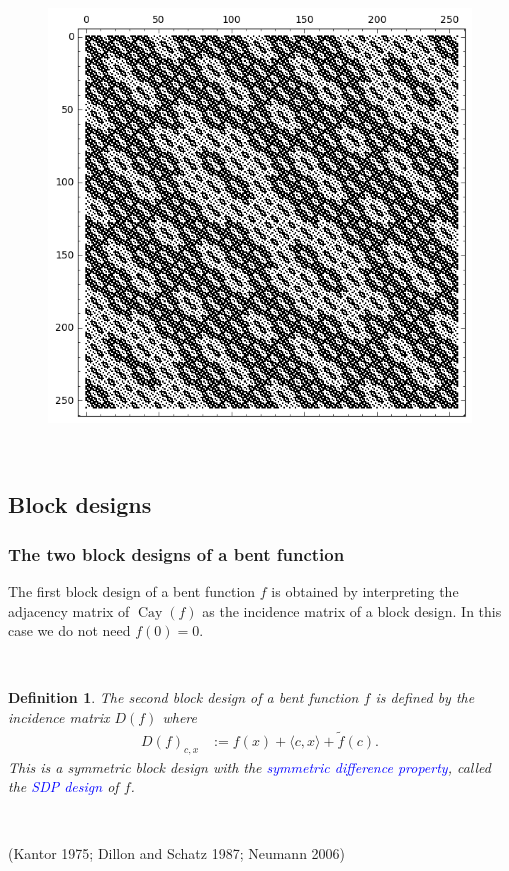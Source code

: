 \documentclass[pdf,sprung,slideColor,nocolorBG]{beamer}
\newenvironment{colortheme}[1]{
\def\ProvidesPackageRCS $##1${\relax}
\renewcommand{\ProcessOptions}{\relax}
\makeatletter

\makeatother
}{}
\newcommand{\slidecite}[1]{\tiny{(#1)}\normalsize{}}
\newcommand{\Emph}[1]{\emph{\textcolor{blue}{#1}}}
\newcommand{\Cay}[1]{\operatorname{Cay}\left(#1\right)}
\newcommand{\dual}[1]{\widetilde{#1}}
\newtheorem{Def}{Definition}
\begin{document}
\begin{colortheme}{jubata}
\begin{frame}
\begin{figure}
\begin{minipage}{.48\textwidth}
  \includegraphics[width=.9\linewidth]{../matrix_plot/c8_1_bent_cayley_graph_index_matrix.png}
  \label{fig:q8_1_bent_cayley_graph_index_matrix}
\end{minipage}
\end{figure}
~
\end{frame}

\end{colortheme}

\subsection{Block designs}

\begin{colortheme}{seagull}

\begin{frame}
\frametitle{The two block designs of a bent function}

The first block design of a bent function $f$ is obtained by interpreting
the adjacency matrix of $\Cay{f}$ as the incidence matrix of a block design.
In this case we do not need $f(0)=0$.

~
\begin{Def}
The second block design of a bent function $f$ is defined by the incidence matrix
$D(f)$ where
\begin{align*}
D(f)_{c,x} &:= f(x) + \langle c, x \rangle + \dual{f}(c).
\end{align*}
This is a symmetric block design with the \Emph{symmetric difference property},
called the \Emph{SDP design} of $f$.
\end{Def}

~

\slidecite{Kantor 1975; Dillon and Schatz 1987; Neumann 2006}
\end{frame}

\end{colortheme}
\end{document}
